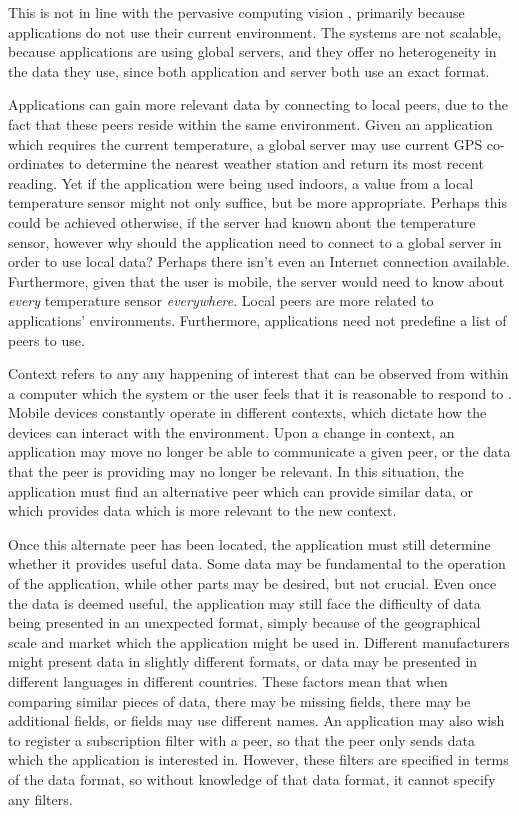 \documentclass[12pt,twoside,notitlepage]{report}
\begin{document}
This is not in line with the pervasive computing vision \cite{weiser1991computer}, primarily because applications do not use their current environment. 
The systems are not scalable, because applications are using global servers, and they offer no heterogeneity\cite{saha2003pervasive} in the data they use, since both application and server both use an exact format.

Applications can gain more relevant data by connecting to local peers, due to the fact that these peers reside within the same environment.
Given an application which requires the current temperature, a global server may use current GPS co-ordinates to determine the nearest weather station and return its most recent reading. 
Yet if the application were being used indoors, a value from a local temperature sensor might not only suffice, but be more appropriate. 
Perhaps this could be achieved otherwise, if the server had known about the temperature sensor, however why should the application need to connect to a global server in order to use local data? Perhaps there isn't even an Internet connection available. 
Furthermore, given that the user is mobile, the server would need to know about {\sl every} temperature sensor {\sl everywhere}. 
Local peers are more related to applications' environments. 
Furthermore, applications need not predefine a list of peers to use.

Context refers to any any happening of interest that can be observed from within a computer which the system or the user feels that it is reasonable to respond to \cite{muhl2006distributed}. 
Mobile devices constantly operate in different contexts, which dictate how the devices can interact with the environment. 
Upon a change in context, an application may move no longer be able to communicate a given peer, or the data that the peer is providing may no longer be relevant. 
In this situation, the application must find an alternative peer which can provide similar data, or which provides data which is more relevant to the new context. 

Once this alternate peer has been located, the application must still determine whether it provides useful data. 
Some data may be fundamental to the operation of the application, while other parts may be desired, but not crucial.  
Even once the data is deemed useful, the application may still face the difficulty of data being presented in an unexpected format, simply because of the geographical scale and market which the application might be used in. 
Different manufacturers might present data in slightly different formats, or data may be presented in different languages in different countries. 
These factors mean that when comparing similar pieces of data, there may be missing fields, there may be additional fields, or fields may use different names. 
An application may also wish to register a subscription filter with a peer, so that the peer only sends data which the application is interested in. 
However, these filters are specified in terms of the data format, so without knowledge of that data format, it cannot specify any filters.
\end{document}
